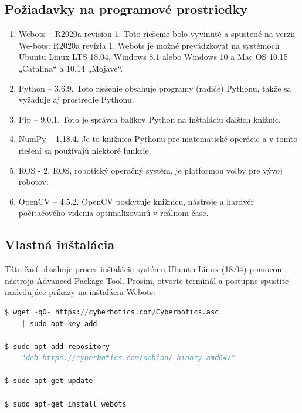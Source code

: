 \documentclass[a4paper]{feidippp}
\begin{document}
\subsection{Požiadavky na programové prostriedky}
\begin{enumerate}
\item Webots – R2020a revision 1. Toto riešenie bolo vyvinuté a spustené na verzii We-bots: R2020a revízia 1. Webots je možné prevádzkovať na systémoch Ubuntu Linux LTS 18.04, Windows 8.1 alebo Windows 10 a Mac OS 10.15 „Catalina“ a 10.14 „Mojave“.
\item Python – 3.6.9. Toto riešenie obsahuje programy (radiče) Pythonu, takže sa vyžaduje aj prostredie Pythonu.
\item Pip – 9.0.1. Toto je správca balíkov Python na inštaláciu ďalších knižníc.
\item NumPy – 1.18.4. Je to knižnica Pythonu pre matematické operácie a v tomto riešení sa používajú niektoré funkcie.
\item ROS - 2. ROS, robotický operačný systém, je platformou voľby pre vývoj robotov.
\item OpenCV – 4.5.2. OpenCV poskytuje knižnicu, nástroje a hardvér počítačového videnia optimalizovanú v reálnom čase.
\end{enumerate}

\subsection{Vlastná inštalácia}

Táto časť obsahuje proces inštalácie systému Ubuntu Linux (18.04) pomocou nástroja Advanced Package Tool. Prosím, otvorte terminál a postupne spustite nasledujúce príkazy na inštaláciu Webots:

\begin{lstlisting}[language=Python, caption=Python example]
$ wget -qO- https://cyberbotics.com/Cyberbotics.asc 
    | sudo apt-key add -

$ sudo apt-add-repository 
    "deb https://cyberbotics.com/debian/ binary-amd64/"

$ sudo apt-get update

$ sudo apt-get install webots
\end{lstlisting}
\vspace{3mm}
\end{document}
